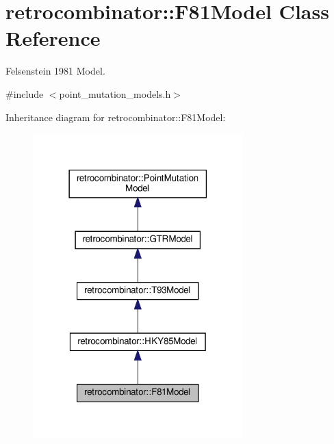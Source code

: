 \hypertarget{classretrocombinator_1_1F81Model}{}\section{retrocombinator\+:\+:F81\+Model Class Reference}
\label{classretrocombinator_1_1F81Model}


Felsenstein 1981 Model.  




{\ttfamily \#include $<$point\+\_\+mutation\+\_\+models.\+h$>$}



Inheritance diagram for retrocombinator\+:\+:F81\+Model\+:\nopagebreak
\begin{figure}[H]
\begin{center}
\leavevmode
\includegraphics[width=230pt]{classretrocombinator_1_1F81Model__inherit__graph}
\end{center}
\end{figure}


